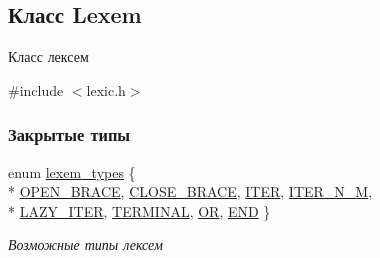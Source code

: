 \hypertarget{class_lexem}{}\subsection{Класс Lexem}
\label{class_lexem}


Класс лексем  




{\ttfamily \#include $<$lexic.\+h$>$}

\subsubsection*{Закрытые типы}
\begin{DoxyCompactItemize}
\item 
enum \hyperlink{class_lexem_af335177220e991d190a36fabef7ecbf4}{lexem\+\_\+types} \{ \\*
\hyperlink{class_lexem_af335177220e991d190a36fabef7ecbf4a0c2b508143050096f01e47223d7b656e}{O\+P\+E\+N\+\_\+\+B\+R\+A\+C\+E}, 
\hyperlink{class_lexem_af335177220e991d190a36fabef7ecbf4a459f9d21f9a7fd564322ff78846d6c55}{C\+L\+O\+S\+E\+\_\+\+B\+R\+A\+C\+E}, 
\hyperlink{class_lexem_af335177220e991d190a36fabef7ecbf4a84aae9f4818d90bf027d51e43fdf2104}{I\+T\+E\+R}, 
\hyperlink{class_lexem_af335177220e991d190a36fabef7ecbf4a233bedb05d38fbfb1176d2f662f86787}{I\+T\+E\+R\+\_\+\+N\+\_\+\+M}, 
\\*
\hyperlink{class_lexem_af335177220e991d190a36fabef7ecbf4a9fa4026ec33d2580f220ff6b8cdae2fb}{L\+A\+Z\+Y\+\_\+\+I\+T\+E\+R}, 
\hyperlink{class_lexem_af335177220e991d190a36fabef7ecbf4aa942c8254c90bee7ec5588a318b84022}{T\+E\+R\+M\+I\+N\+A\+L}, 
\hyperlink{class_lexem_af335177220e991d190a36fabef7ecbf4a629e010881951d564f7bb217dacb0b74}{O\+R}, 
\hyperlink{class_lexem_af335177220e991d190a36fabef7ecbf4a45577586a792f3738569d22ff9192976}{E\+N\+D}
 \}\begin{DoxyCompactList}\small\item\em Возможные типы лексем \end{DoxyCompactList}
\end{DoxyCompactItemize}
